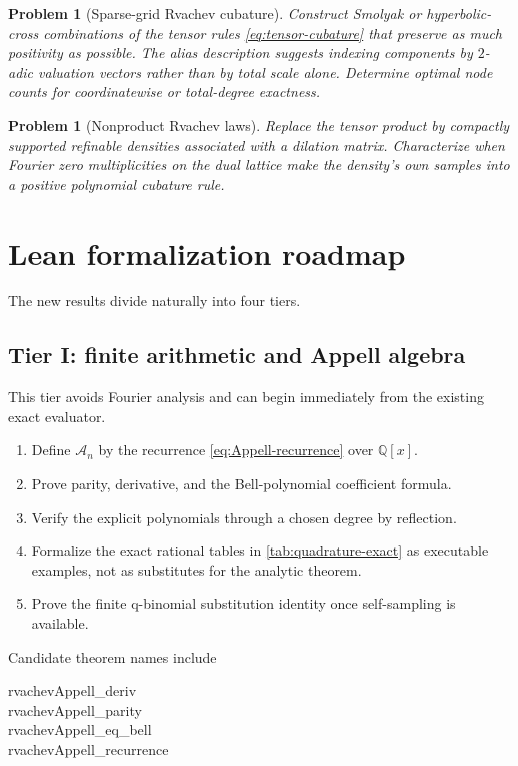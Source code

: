 \documentclass[11pt]{article}
\numberwithin{equation}{section}
\newtheorem{problem}[theorem]{Problem}
\theoremstyle{definition}
\theoremstyle{remark}
\newcommand{\Q}{\mathbb Q}
\newcommand{\Acal}{\mathscr A}
\begin{document}
\begin{problem}[Sparse-grid Rvachev cubature]
\label{prob:sparse-grid}
Construct Smolyak or hyperbolic-cross combinations of the tensor rules \eqref{eq:tensor-cubature} that preserve as much positivity as possible.  The alias description suggests indexing components by $2$-adic valuation vectors rather than by total scale alone.  Determine optimal node counts for coordinatewise or total-degree exactness.
\end{problem}

\begin{problem}[Nonproduct Rvachev laws]
\label{prob:nonproduct-laws}
Replace the tensor product by compactly supported refinable densities associated with a dilation matrix.  Characterize when Fourier zero multiplicities on the dual lattice make the density's own samples into a positive polynomial cubature rule.
\end{problem}

\section{Lean formalization roadmap}
\label{sec:lean}

The new results divide naturally into four tiers.

\subsection{Tier I: finite arithmetic and Appell algebra}

This tier avoids Fourier analysis and can begin immediately from the existing exact evaluator.
\begin{enumerate}[label=\textbf{I.\arabic*}]
\item Define $\Acal_n$ by the recurrence \eqref{eq:Appell-recurrence} over $\Q[x]$.
\item Prove parity, derivative, and the Bell-polynomial coefficient formula.
\item Verify the explicit polynomials through a chosen degree by reflection.
\item Formalize the exact rational tables in \cref{tab:quadrature-exact} as executable examples, not as substitutes for the analytic theorem.
\item Prove the finite q-binomial substitution identity once self-sampling is available.
\end{enumerate}
Candidate theorem names include
\begin{center}
\begin{minipage}{0.86\textwidth}\small\ttfamily
rvachevAppell\_deriv\\
rvachevAppell\_parity\\
rvachevAppell\_eq\_bell\\
rvachevAppell\_recurrence
\end{minipage}
\end{center}
\end{document}
